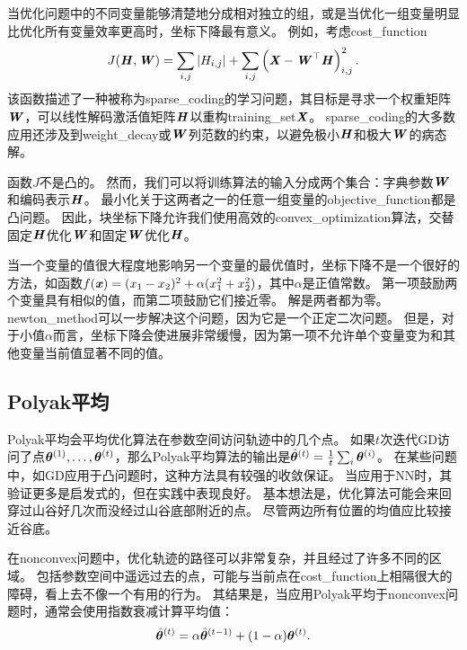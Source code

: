 当优化问题中的不同变量能够清楚地分成相对独立的组，或是当优化一组变量明显比优化所有变量效率更高时，坐标下降最有意义。
例如，考虑\gls{cost_function}
\begin{equation}
    J(\boldsymbol{\mathit{H}}, \boldsymbol{\mathit{W}}) = \sum_{i,j} |H_{i,j}| + \sum_{i,j} \left( \boldsymbol{\mathit{X}} - \boldsymbol{\mathit{W}}^\top \boldsymbol{\mathit{H}} \right)_{i,j}^2 .
\end{equation}
该函数描述了一种被称为\gls{sparse_coding}的学习问题，其目标是寻求一个权重矩阵$\boldsymbol{\mathit{W}}$，可以线性解码激活值矩阵$\boldsymbol{\mathit{H}}$以重构\gls{training_set}$\boldsymbol{\mathit{X}}$。
\gls{sparse_coding}的大多数应用还涉及到\gls{weight_decay}或$\boldsymbol{\mathit{W}}$列范数的约束，以避免极小$\boldsymbol{\mathit{H}}$和极大$\boldsymbol{\mathit{W}}$的病态解。

函数$J$不是凸的。
然而，我们可以将训练算法的输入分成两个集合：字典参数$\boldsymbol{\mathit{W}}$和编码表示$\boldsymbol{\mathit{H}}$。
最小化关于这两者之一的任意一组变量的\gls{objective_function}都是凸问题。
因此，块坐标下降允许我们使用高效的\gls{convex_optimization}算法，交替固定$\boldsymbol{\mathit{H}}$优化$\boldsymbol{\mathit{W}}$和固定$\boldsymbol{\mathit{W}}$优化$\boldsymbol{\mathit{H}}$。

当一个变量的值很大程度地影响另一个变量的最优值时，坐标下降不是一个很好的方法，如函数$f(\boldsymbol{\mathit{x}})=(x_1 - x_2)^2+\alpha(x_1^2 + x_2^2)$，其中$\alpha$是正值常数。
第一项鼓励两个变量具有相似的值，而第二项鼓励它们接近零。
解是两者都为零。
\gls{newton_method}可以一步解决这个问题，因为它是一个正定二次问题。
但是，对于小值$\alpha$而言，坐标下降会使进展非常缓慢，因为第一项不允许单个变量变为和其他变量当前值显著不同的值。


\subsection{Polyak平均}
\label{sec:polyak_averaging}
Polyak平均\citep{Polyak+Juditsky-1992}会平均优化算法在参数空间访问轨迹中的几个点。
如果$t$次迭代\gls{GD}访问了点$\boldsymbol{\theta}^{(1)},\dots,\boldsymbol{\theta}^{(t)}$，那么Polyak平均算法的输出是$\hat{\boldsymbol{\theta}}^{(t)} = \frac{1}{t} \sum_i \boldsymbol{\theta}^{(i)}$。
在某些问题中，如\gls{GD}应用于凸问题时，这种方法具有较强的收敛保证。
当应用于\gls{NN}时，其验证更多是启发式的，但在实践中表现良好。
基本想法是，优化算法可能会来回穿过山谷好几次而没经过山谷底部附近的点。
尽管两边所有位置的均值应比较接近谷底。


在\gls{nonconvex}问题中，优化轨迹的路径可以非常复杂，并且经过了许多不同的区域。
包括参数空间中遥远过去的点，可能与当前点在\gls{cost_function}上相隔很大的障碍，看上去不像一个有用的行为。
其结果是，当应用Polyak平均于\gls{nonconvex}问题时，通常会使用指数衰减计算平均值：
\begin{equation}
    \hat{\boldsymbol{\theta}}^{(t)} = \alpha \hat{\boldsymbol{\theta}}^{(t-1)} + (1-\alpha) \boldsymbol{\theta}^{(t)} .
\end{equation}

